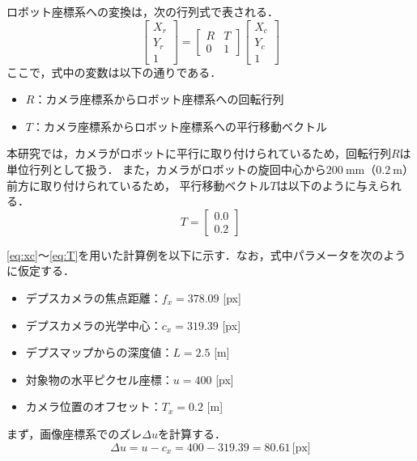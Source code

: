 ロボット座標系への変換は，次の行列式で表される．
\begin{equation}
    \begin{bmatrix}
        X_r \\ Y_r \\ 1
    \end{bmatrix}
    =
    \begin{bmatrix}
        R & T \\ 
        0 & 1
    \end{bmatrix}
    \begin{bmatrix}
        X_c \\ Y_c \\ 1
    \end{bmatrix}
    \label{eq:transform}
\end{equation}
ここで，式中の変数は以下の通りである．
\begin{itemize}
    \item $R$：カメラ座標系からロボット座標系への回転行列
    \item $T$：カメラ座標系からロボット座標系への平行移動ベクトル
\end{itemize}

本研究では，カメラがロボットに平行に取り付けられているため，回転行列$R$は単位行列として扱う．
また，カメラがロボットの旋回中心から$200\ \mathrm{mm}$（$0.2\ \mathrm{m}$）前方に取り付けられているため，
平行移動ベクトル$T$は以下のように与えられる．
\begin{equation}
    T = \begin{bmatrix} 0.0 \\ 0.2 \end{bmatrix}
    \label{eq:T}  %
\end{equation}

\eqref{eq:xc}～\eqref{eq:T}を用いた計算例を以下に示す．なお，式中パラメータを次のように仮定する．
\begin{itemize}
    \item デプスカメラの焦点距離：$f_x = 378.09$ [px]
    \item デプスカメラの光学中心：$c_x = 319.39$ [px]
    \item デプスマップからの深度値：$L = 2.5$ [m]
    \item 対象物の水平ピクセル座標：$u = 400$ [px]
    \item カメラ位置のオフセット：$T_x = 0.2$ [m]
\end{itemize}

まず，画像座標系でのズレ$\Delta u$を計算する．
\begin{equation}
    \Delta u = u - c_x = 400 - 319.39 = 80.61 \, \text{[px]}
\end{equation}

